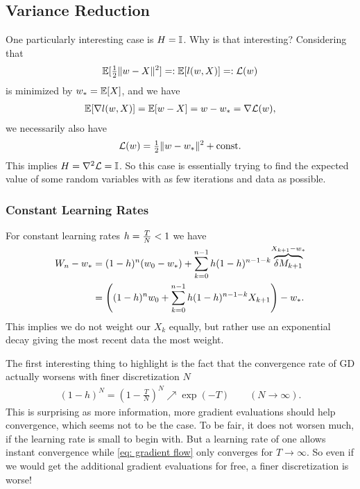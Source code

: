 \subsection{Variance Reduction}\label{subsec: variance reduction}

One particularly interesting case is \(H=\mathbb{I}\). Why is that interesting?
Considering that
\begin{align*}
	\mathbb{E}[\tfrac12\|w-X\|^2]=:\mathbb{E}[l(w,X)]=:\mathcal{L}(w)
\end{align*}
is minimized by \(w_*=\mathbb{E}[X]\), and we have
\begin{align*}
	\mathbb{E}[\nabla l(w,X)]
	=\mathbb{E}[w-X]=w- w_*=\nabla\mathcal{L}(w),
\end{align*}
we necessarily also have
\begin{align*}
	\mathcal{L}(w) = \tfrac12\|w-w_*\|^2 + \text{const}.
\end{align*}
This implies \(H=\nabla^2\mathcal{L}=\mathbb{I}\). So this case is essentially
trying to find the expected value of some random variables with as few
iterations and data as possible.

\subsubsection{Constant Learning Rates}

For constant learning rates \(h=\frac{T}N<1\) we have
\begin{align*}
	W_n - w_*
	&= (1-h)^n(w_0 -w_*)+ \sum_{k=0}^{n-1}h(1-h)^{n-1-k}
	\smash{\overbrace{\delta M_{k+1}}^{X_{k+1}-w_*}}\\
	&= \left((1-h)^nw_0 + \sum_{k=0}^{n-1}h(1-h)^{n-1-k}X_{k+1}\right)-w_*.
\end{align*}
This implies we do not weight our \(X_k\) equally, but rather use an
exponential decay giving the most recent data the most weight.

The first interesting thing to highlight is the fact that the convergence
rate of GD actually worsens with finer discretization \(N\)
\begin{align*}
	(1-h)^N = (1-\tfrac{T}N)^N \nearrow \exp(-T) \qquad (N\to\infty).
\end{align*}
This is surprising as more information, more gradient evaluations should help
convergence, which seems not to be the case. To be fair, it does not worsen
much, if the learning rate is small to begin with. But a learning rate of one
allows instant convergence while \ref{eq:
gradient flow} only converges for \(T\to\infty\). So even if we would get
the additional gradient evaluations for free, a finer discretization is worse!

